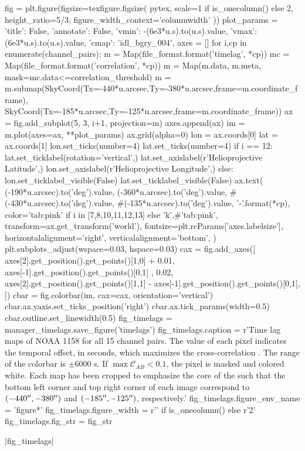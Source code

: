 \begin{pycode}
fig = plt.figure(figsize=texfigure.figsize(
    pytex,
    scale=1 if is_onecolumn() else 2,
    height_ratio=5/3,
    figure_width_context='columnwidth'
))
plot_params = {
    'title': False, 
    'annotate': False,
    'vmin': -(6e3*u.s).to(u.s).value,
    'vmax': (6e3*u.s).to(u.s).value,
    'cmap': 'idl_bgry_004',
}
axes = []
for i,cp in enumerate(channel_pairs):
    m = Map(file_format.format('timelag', *cp))
    mc = Map(file_format.format('correlation', *cp))
    m = Map(m.data, m.meta, mask=mc.data<=correlation_threshold)
    m = m.submap(SkyCoord(Tx=-440*u.arcsec,Ty=-380*u.arcsec,frame=m.coordinate_frame),
                 SkyCoord(Tx=-185*u.arcsec,Ty=-125*u.arcsec,frame=m.coordinate_frame))
    ax = fig.add_subplot(5, 3, i+1, projection=m)
    axes.append(ax)
    im = m.plot(axes=ax, **plot_params)
    ax.grid(alpha=0)
    lon = ax.coords[0]
    lat = ax.coords[1]
    lon.set_ticks(number=4)
    lat.set_ticks(number=4) 
    if i == 12:
        lat.set_ticklabel(rotation='vertical',)
        lat.set_axislabel(r'Helioprojective Latitude',)
        lon.set_axislabel(r'Helioprojective Longitude',)
    else:
        lon.set_ticklabel_visible(False)
        lat.set_ticklabel_visible(False)
    ax.text(
        (-190*u.arcsec).to('deg').value,
        (-360*u.arcsec).to('deg').value,
        #(-430*u.arcsec).to('deg').value,
        #(-135*u.arcsec).to('deg').value,
        '{}-{}'.format(*cp),
        color='tab:pink' if i in [7,8,10,11,12,13] else 'k',#'tab:pink',
        transform=ax.get_transform('world'),
        fontsize=plt.rcParams['axes.labelsize'],
        horizontalalignment='right',
        verticalalignment='bottom',
    )
plt.subplots_adjust(wspace=0.03, hspace=0.03)
cax = fig.add_axes([
    axes[2].get_position().get_points()[1,0] + 0.01,
    axes[-1].get_position().get_points()[0,1] ,
    0.02,
    axes[2].get_position().get_points()[1,1] - axes[-1].get_position().get_points()[0,1], 
])
cbar = fig.colorbar(im, cax=cax, orientation='vertical')
cbar.ax.yaxis.set_ticks_position('right')
cbar.ax.tick_params(width=0.5)
cbar.outline.set_linewidth(0.5)
fig_timelags = manager_timelags.save_figure('timelags')
fig_timelags.caption = r'Time lag maps of \AR{} NOAA 1158 for all 15 channel pairs. The value of each pixel indicates the temporal offset, in seconds, which maximizes the cross-correlation . The range of the colorbar is $\pm6000$ s. If $\max\mathcal{C}_{AB}<0.1$, the pixel is masked and colored white. Each map has been cropped to emphasize the core of the \AR{} such that the bottom left corner and top right corner of each image correspond to $(-440\mbox{$^{\prime\prime}$},-380\mbox{$^{\prime\prime}$})$ and $(-185\mbox{$^{\prime\prime}$},-125\mbox{$^{\prime\prime}$})$, respectively.'
fig_timelags.figure_env_name = 'figure*'
fig_timelags.figure_width = r'\columnwidth' if is_onecolumn() else r'2\columnwidth'
fig_timelags.fig_str = fig_str
\end{pycode}
|fig_timelags|

